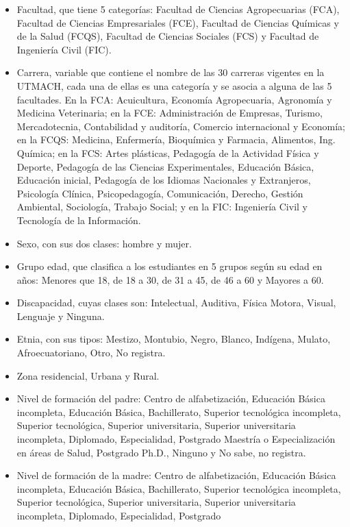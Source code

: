 \documentclass[water,article,submit,moreauthors,pdftex]{mdpi}
\begin{document}
\begin{itemize}
\item
  Facultad, que tiene 5 categorías: Facultad de Ciencias Agropecuarias
  (FCA), Facultad de Ciencias Empresariales (FCE), Facultad de Ciencias
  Químicas y de la Salud (FCQS), Facultad de Ciencias Sociales (FCS) y
  Facultad de Ingeniería Civil (FIC).
\item
  Carrera, variable que contiene el nombre de las 30 carreras vigentes
  en la UTMACH, cada una de ellas es una categoría y se asocia a alguna
  de las 5 facultades. En la FCA: Acuicultura, Economía Agropecuaria,
  Agronomía y Medicina Veterinaria; en la FCE: Administración de
  Empresas, Turismo, Mercadotecnia, Contabilidad y auditoría, Comercio
  internacional y Economía; en la FCQS: Medicina, Enfermería, Bioquímica
  y Farmacia, Alimentos, Ing. Química; en la FCS: Artes plásticas,
  Pedagogía de la Actividad Física y Deporte, Pedagogía de las Ciencias
  Experimentales, Educación Básica, Educación inicial, Pedagogía de los
  Idiomas Nacionales y Extranjeros, Psicología Clínica, Psicopedagogía,
  Comunicación, Derecho, Gestión Ambiental, Sociología, Trabajo Social;
  y en la FIC: Ingeniería Civil y Tecnología de la Información.
\item
  Sexo, con sus dos clases: hombre y mujer.
\item
  Grupo edad, que clasifica a los estudiantes en 5 grupos según su edad
  en años: Menores que 18, de 18 a 30, de 31 a 45, de 46 a 60 y Mayores
  a 60.
\item
  Discapacidad, cuyas clases son: Intelectual, Auditiva, Física Motora,
  Visual, Lenguaje y Ninguna.
\item
  Etnia, con sus tipos: Mestizo, Montubio, Negro, Blanco, Indígena,
  Mulato, Afroecuatoriano, Otro, No registra.
\item
  Zona residencial, Urbana y Rural.
\item
  Nivel de formación del padre: Centro de alfabetización, Educación
  Básica incompleta, Educación Básica, Bachillerato, Superior
  tecnológica incompleta, Superior tecnológica, Superior universitaria,
  Superior universitaria incompleta, Diplomado, Especialidad, Postgrado
  Maestría o Especialización en áreas de Salud, Postgrado Ph.D., Ninguno
  y No sabe, no registra.
\item
  Nivel de formación de la madre: Centro de alfabetización, Educación
  Básica incompleta, Educación Básica, Bachillerato, Superior
  tecnológica incompleta, Superior tecnológica, Superior universitaria,
  Superior universitaria incompleta, Diplomado, Especialidad, Postgrado

\end{itemize}
\end{document}
